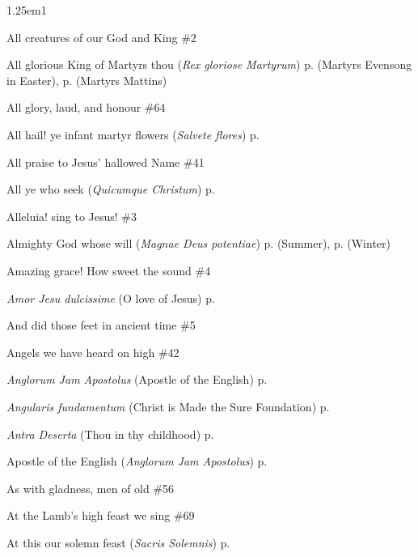 \begin{hangparas}{1.25em}{1}
\par\noindent
All creatures of our God and King \dotfill \#2
\par\noindent
All glorious King of Martyrs thou (\textit{Rex gloriose Martyrum}) \dotfill p. \pageref{MartyrsEvensongEaster} (Martyrs Evensong in Easter), p. \pageref{MartyrsMattins} (Martyrs Mattins)
\par\noindent
All glory, laud, and honour \dotfill \#64
\par\noindent
All hail! ye infant martyr flowers (\textit{Salvete flores}) \dotfill p. \pageref{HolyInnocentsMattinsHymn}
\par\noindent
All praise to Jesus' hallowed Name \dotfill \#41
\par\noindent
All ye who seek (\textit{Quicumque Christum}) \dotfill p. \pageref{TransfigurationEvensong}
\par\noindent
Alleluia! sing to Jesus!  \dotfill \#3
\par\noindent
Almighty God whose will (\textit{Magnae Deus potentiae}) \dotfill p. \pageref{ThursdayEvensongSummer} (Summer), p. \pageref{ThursdayEvensongWinter} (Winter)
\par\noindent
Amazing grace! How sweet the sound \dotfill \#4
\par\noindent
\textit{Amor Jesu dulcissime} (O love of Jesus) \dotfill p. \pageref{TransfigurationMattins}
\par\noindent
And did those feet in ancient time \dotfill \#5
\par\noindent
Angels we have heard on high \dotfill \#42
\par\noindent
\textit{Anglorum Jam Apostolus} (Apostle of the English) \dotfill p. \pageref{GregoryEvensong}
\par\noindent
\textit{Angularis fundamentum} (Christ is Made the Sure Foundation) \dotfill p. \pageref{DedicationMattins}
\par\noindent
\textit{Antra Deserta} (Thou in thy childhood) \dotfill p. \pageref{JohnBaptistInvitatory}
\par\noindent
Apostle of the English (\textit{Anglorum Jam Apostolus}) \dotfill p. \pageref{GregoryEvensong}
\par\noindent
As with gladness, men of old \dotfill \#56
\par\noindent
At the Lamb's high feast we sing \dotfill \#69
\par\noindent
At this our solemn feast (\textit{Sacris Solemnis}) \dotfill p. \pageref{CorpusChristiInvitatory}
\par\noindent

\end{hangparas}
